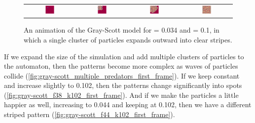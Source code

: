 \begin{figure}[h]
\centering
\mySfFamily
\begin{tabular}{c c c c}
\includegraphics[width = 0.19\textwidth]{../images/gs_f038_k100_Moment_1.png} & \includegraphics[width = 0.19\textwidth]{../images/gs_f038_k100_Moment_2.png} & \includegraphics[width = 0.19\textwidth]{../images/gs_f038_k100_Moment_3.png} & \includegraphics[width = 0.19\textwidth]{../images/gs_f038_k100_Moment_4.png}
\end{tabular}
\caption{An animation of the Gray-Scott model for  = 0.034 and  = 0.1, in which a single cluster of  particles expands outward into clear stripes.}
\label{fig:gray-scott_movie_first_frame}
\end{figure}

If we expand the size of the simulation and add multiple clusters of  particles to the automaton, then the patterns become more complex as waves of  particles collide (\autoref{fig:gray-scott_multiple_predators_first_frame}). If we keep  constant and increase  slightly to 0.102, then the patterns change significantly into spots (\autoref{fig:gray-scott_f38_k102_first_frame}). And if we make the  particles a little happier as well, increasing   to 0.044 and keeping  at 0.102, then we have a different striped pattern (\autoref{fig:gray-scott_f44_k102_first_frame}).\\


